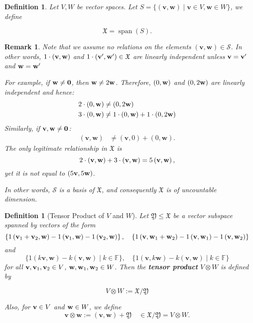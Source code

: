 \documentclass[11pt]{article}
\newtheorem{definition}[theorem]{Definition}
\newtheorem{remark}[theorem]{Remark}
\begin{document}
\begin{definition} Let \(V,W\) be vector spaces. Let \(S = \{ \left( {\mathbf{v},\mathbf{w}}\right)  \mid  \mathbf{v} \in  V,\mathbf{w} \in  W\}\), we define

\[
\mathfrak{X} = \operatorname{span}\left( S\right).
\]
\end{definition}

\begin{remark}
    Note that we assume no relations on the elements \(\left( {\mathbf{v},\mathbf{w}}\right)  \in  \mathcal{S}\). In other words, $1\cdot ({\bf v}, {\bf w})$ and $1 \cdot ({\bf v}', {\bf w}') \in \mathfrak{X}$ are linearly independent unless ${\bf v} = {\bf v}'$ and ${\bf w} = {\bf w}'$ 
    
    For example, if ${\bf w} \neq {\bf 0}$, then ${\bf w} \neq 2{\bf w}$. Therefore, $(0,{\bf w})$ and $(0, 2{\bf w})$ are linearly independent and hence:
    \begin{align*} 
    2\cdot \left( {0,\mathbf{w}}\right)  &\neq  \left( {0,2\mathbf{w}}\right)\\
3\cdot \left( {0,\mathbf{w}}\right) &\neq 1\cdot \left( {0,\mathbf{w}}\right)  + 1\cdot\left( {0,{2\bf w}}\right)  \end{align*}
Similarly, if ${\bf v}, {\bf w} \neq {\bf 0}$:
\begin{align*}
\left(\mathbf{v},\mathbf{w}\right) &\neq \left( \mathbf{v},0\right)  +  \left( 0,\mathbf{w}\right). \end{align*}
The only legitimate relationship in $\mathfrak{X}$ is
\[
2\cdot \left( \mathbf{v},{\bf w}\right)  + 3\cdot \left(\mathbf{v},\mathbf{w}\right)  = 5\left( {\mathbf{v},\mathbf{w}}\right) ,
\]
yet it is not equal to $(5{\bf v},5{\bf w})$.

\medskip
In other words, \(\mathcal{S}\) is a basis of \(\mathfrak{X}\), and consequently \(\mathfrak{X}\) is of uncountable dimension.
\end{remark}


\begin{definition}[Tensor Product of $V$ and $W$] Let \(\mathfrak{Y} \leq  \mathfrak{X}\) be a vector subspace spanned by vectors of the form
\[
\left\{  {1\left( {{\bf v}_1+{\bf v}_2,\mathbf{w}}\right)  - 1\left( {{\bf v}_1,\mathbf{w}}\right)  - 1\left( {{\bf v}_2,\mathbf{w}}\right) }\right\}  ,\quad \left\{  {1\left( {\mathbf{v},{\bf w}_1 + {\bf w}_2}\right)  - 1\left( {\mathbf{v},{\bf w}_1}\right)  - 1\left( {\mathbf{v},{\bf w}_2}\right) }\right\}
\]
and
\[
\{ 1\left( {k\mathbf{v},\mathbf{w}}\right)  - k\left( {\mathbf{v},\mathbf{w}}\right)  \mid  k \in  \mathbb{F}\},
\quad
\{ 1\left( {\mathbf{v},k\mathbf{w}}\right)  - k\left( {\mathbf{v},\mathbf{w}}\right)  \mid  k \in  \mathbb{F}\}
\]
for all ${\bf v}, {\bf v}_1, {\bf v}_2 \in V$, ${\bf w}, {\bf w}_1, {\bf w}_2 \in W$. Then the {\bf tensor product} \(V \otimes  W\) is defined by

\[
V \otimes  W := \mathfrak{X}/\mathfrak{Y}
\]

Also, for ${\bf v} \in V$ and ${\bf w} \in W$, we define 
\[\mathbf{v} \otimes  \mathbf{w} := \left( {\mathbf{v},\mathbf{w}}\right)  + \mathfrak{Y} \quad \in  \mathfrak{X}/\mathfrak{Y} = V \otimes W.\]
\end{definition}
\end{document}
